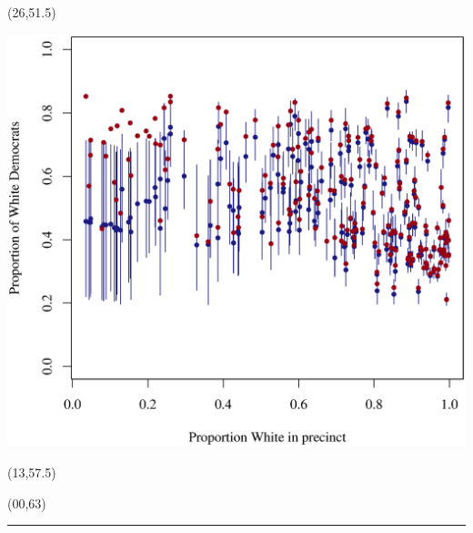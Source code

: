 \documentclass{article}
\def\CHead#1{\bigskip\begin{center}\noindent{\Large\color{DarkBlue} #1}\end{center}}
\renewcommand{\small}{\fontsize{24.88}{30}\selectfont}
\renewcommand{\Large}{\fontsize{51.6}{64}\selectfont}
\begin{document}
\begin{textblock}{12}(26,51.5)
\begin{center}
\includegraphics[width=10in]{cover.nocov.eps}
\end{center}
\end{textblock}


\begin{textblock}{12}(13,57.5)
{\small


}
\end{textblock}


\begin{textblock}{38}(00,63)
\rule{34in}{4pt}
\end{textblock}


\end{document}

